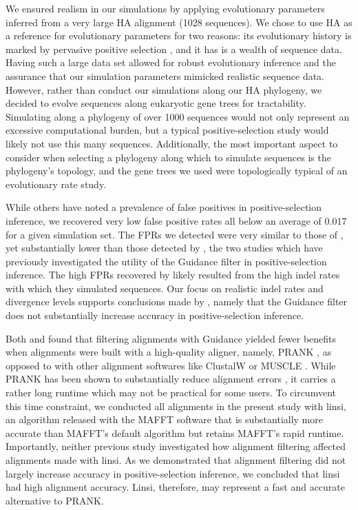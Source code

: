 \documentclass[10pt]{article}
\begin{document}
We ensured realism in our simulations by applying evolutionary parameters inferred from a very large HA alignment (1028 sequences). We chose to use HA as a reference for evolutionary parameters for two reasons: its evolutionary history is marked by pervasive positive selection \citep{Bush1999, Kryazhimskiy2008, Meyer2012}, and it has is a wealth of sequence data. Having such a large data set allowed for robust evolutionary inference and the assurance that our simulation parameters mimicked realistic sequence data. However, rather than conduct our simulations along our HA phylogeny, we decided to evolve sequences along eukaryotic gene trees for tractability. Simulating along a phylogeny of over 1000 sequences would not only represent an excessive computational burden, but a typical positive-selection study would likely not use this many sequences. Additionally, the most important aspect to consider when selecting a phylogeny along which to simulate sequences is the phylogeny's topology, and the gene trees we used were topologically typical of an evolutionary rate study.

While others \citep{Schneider2009, Fletcher2010, MarkovaRaina2011,Privman2012} have noted a prevalence of false positives in positive-selection inference, we recovered very low false positive rates all below an average of 0.017 for a given simulation set. The FPRs we detected were very similar to those of \citet{Jordan2012}, yet substantially lower than those detected by \citet{Privman2012}, the two studies which have previously investigated the utility of the Guidance filter in positive-selection inference. The high FPRs recovered by \citet{Privman2012} likely resulted from the high indel rates with which they simulated sequences. Our focus on realistic indel rates and divergence levels supports conclusions made by \citet{Jordan2012}, namely that the Guidance filter does not substantially increase accuracy in positive-selection inference.

Both \citet{Privman2012} and \citet{Jordan2012} found that filtering alignments with Guidance yielded fewer benefits when alignments were built with a high-quality aligner, namely, PRANK \citep{Loytynoja2008}, as opposed to with other alignment softwares like ClustalW \citep{Thompson1994} or MUSCLE \citep{Edgar2004}. While PRANK has been shown to substantially reduce alignment errors \citep{Loytynoja2008,Privman2012,Jordan2012}, it carries a rather long runtime which may not be practical for some users. To circumvent this time constraint, we conducted all alignments in the present study with linsi, an algorithm released with the MAFFT software that is substantially more accurate than MAFFT's default algorithm \citep{Katoh2005, Nuin2006, Thompson2011} but retains MAFFT's rapid runtime. Importantly, neither previous study investigated how alignment filtering affected alignments made with linsi. As we demonstrated that alignment filtering did not largely increase accuracy in positive-selection inference, we concluded that linsi had high alignment accuracy. Linsi, therefore, may represent a fast and accurate alternative to PRANK.
\end{document}
